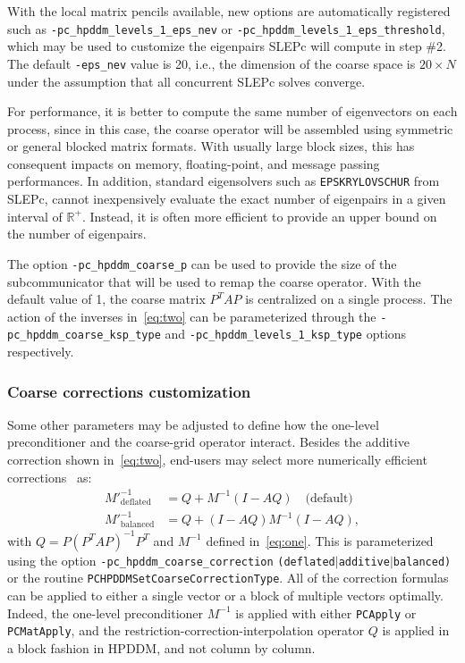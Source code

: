 \documentclass[3p,11pt]{elsarticle}
\newcommand{\pk}[1]{\texttt{#1}}
\begin{document}
With the local
matrix pencils available, new options are automatically registered such as
\pk{-pc\_hpddm\_levels\_1\_eps\_nev} or \pk{-pc\_hpddm\_levels\_1\_eps\_threshold}, which
may be used to customize the eigenpairs SLEPc will compute in step \#2. The
default \pk{-eps\_nev} value is 20, i.e., the dimension of the coarse space is
$20\times N$ under the assumption that all concurrent SLEPc solves converge.

For performance, it is better to compute the same number of
eigenvectors on each process, since in this case, the coarse operator will be
assembled using symmetric or general blocked matrix formats. With
usually large block sizes, this has consequent impacts on memory, floating-point, and message passing performances.
In addition,
standard eigensolvers such as \pk{EPSKRYLOVSCHUR} from SLEPc, cannot inexpensively
evaluate the exact number of eigenpairs in a given interval of $\mathbb{R}^+$.
Instead, it is often more efficient to provide an upper bound on the number of
eigenpairs.

The option \pk{-pc\_hpddm\_coarse\_p} can be used to provide the size of the
subcommunicator that will be used to remap the coarse operator. With the default
value of 1, the coarse matrix $P^TAP$ is centralized on a single process.
The action of the inverses in~\cref{eq:two} can be parameterized through the
\pk{-pc\_hpddm\_coarse\_ksp\_type} and \pk{-pc\_hpddm\_levels\_1\_ksp\_type} options
respectively.

    \subsubsection{Coarse corrections customization}
Some other parameters may be adjusted to define how the one-level preconditioner
and the coarse-grid operator interact. Besides the additive
correction shown in~\cref{eq:two}, end-users may select more numerically efficient
corrections~\cite{tang2009comparison,bastian1998additive} as:
\begin{align*}
    M'^{-1}_{\text{deflated}} &= Q + M^{-1}\left(I - AQ\right)\quad
    \text{(default)}\\
    M'^{-1}_{\text{balanced}} &= Q + \left(I - AQ\right)M^{-1}\left(I - AQ\right),
\end{align*}
with $Q = P \left(P^T A P\right)^{-1} P^T$ and $M^{-1}$ defined in~\cref{eq:one}. This is parameterized using the
option \pk{-pc\_hpddm\_coarse\_correction}
\pk{(deflated$|$additive$|$balanced)} or the routine\linebreak
\pk{PCHPDDMSetCoarseCorrectionType}. All of
the correction formulas can be applied to either a single vector or a block
of multiple vectors optimally. Indeed, the one-level preconditioner $M^{-1}$ is
applied with either \pk{PCApply} or \pk{PCMatApply}, and the
restriction-correction-interpolation operator $Q$ is applied in a block fashion
in HPDDM, and not column by column. %
\end{document}

